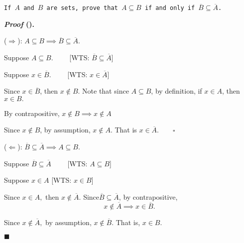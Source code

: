 \documentclass[12pt,a4paper]{article}
\newcounter{nprf}[subsection]
\newenvironment*{prf}{\par\indent\textbf{\textit{Proof} (\stepcounter{nprf}\thenprf). }\par}{\par\hfill $\blacksquare$\par}
\begin{document}
\begin{framed}
\noindent\texttt{If $A$ and $B$ are sets, prove that $A\subseteq B$ if and only if $\overline{B}\subseteq\overline{A}$.}
\begin{prf}
	($\Rightarrow$): $A\subseteq B\implies\overline{B}\subseteq\overline{A}.$\par\hspace{5mm}Suppose $A\subseteq B.$ $\qquad$[WTS: $\overline{B}\subseteq\overline{A}$]\par\hspace{5mm}Suppose $x\in\overline{B}.$ $\qquad$[WTS: $x\in\overline{A}$]\par\hspace{5mm}Since $x\in\overline{B}$, then $x\notin B$. Note that since $A\subseteq B$, by definition, if $x\in A$, then $x\in B.$\par\hspace{5mm}By contrapositive, $x\notin B\implies x\notin A$\par\hspace{5mm}Since $x\notin B$, by assumption, $x\notin A$. That is $x\in\overline{A}.$$\qquad\square$\par ($\Leftarrow$): $\overline{B}\subseteq\overline{A}\implies A\subseteq B.$\par\hspace{5mm}Suppose $\overline{B}\subseteq\overline{A}$ $\qquad$[WTS: $A\subseteq B$]\par\hspace{5mm}Suppose $x\in A$ [WTS: $x\in B$]\par\hspace{5mm}Since $x\in A,$ then $x\notin\overline{A}.$ Since$\overline{B}\subseteq\overline{A}$, by contrapositive, \[x\notin\overline{A}\implies x\in\overline{B}.\]\par\hspace{5mm}Since $x\notin\overline{A},$ by assumption, $x\notin\overline{B}$. That is, $x\in B$.
\end{prf}	
\end{framed}
\end{document}
